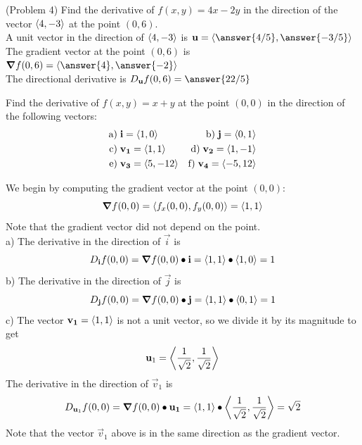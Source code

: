 \documentclass[handout]{ximera}
\begin{document}
\begin{problem}(Problem 4)
Find the derivative of $f(x,y) = 4x - 2y$ in the direction of the 
vector $\left\langle 4, -3\right\rangle$ at the point $(0, 6)$.\\
A unit vector in the direction of $\left\langle 4, -3\right\rangle$ is 
$\vec u = \vector{\answer{4/5}, \answer{-3/5}}$\\
The gradient vector at the point $(0,6)$ is 
$\grad f(0,6) = \vector{\answer{4}, \answer{-2}}$\\
The directional derivative is $D_{\vec u} f(0,6) = \answer{22/5}$
\end{problem}


\begin{example}[Example 5]
Find the derivative of $f(x,y) = x+y$ at the point $(0,0)$ in the direction 
of the following vectors:
\begin{align*}
\text{a)} \; &\mathbf{i} = \left\langle 1,0\right\rangle  &\text{b)}\;  \mathbf{j} = \left\langle 0,1\right\rangle\\
\text{c)} \; &\mathbf{v_1} = \left\langle 1,1\right\rangle  &\text{d)} \; \mathbf{v_2} = \left\langle 1, -1\right\rangle\\
\text{e)} \; &\mathbf{v_3} = \left\langle 5, -12\right\rangle & \text{f)} \; \mathbf{v_4} = \left\langle -5, 12\right\rangle
\end{align*}

We begin by computing the gradient vector at the point $(0,0)$:
\[
\boldsymbol\nabla f(0,0) = \left\langle f_x(0,0), f_y(0,0)\right\rangle = \left\langle 1,1\right\rangle
\]
Note that the gradient vector did not depend on the point.\\
a) \quad The derivative in the direction of $\vec i$ is
\[
D_{\mathbf i} f(0,0) = \boldsymbol\nabla f(0,0) \bullet \mathbf{i} = \left\langle 1,1\right\rangle \bullet \left\langle 1,0\right\rangle = 1
\]
b) \quad The derivative in the direction of $\vec j$ is
\[
D_{\mathbf j} f(0,0) = \boldsymbol\nabla f(0,0) \bullet \mathbf{j} = \left\langle 1,1\right\rangle \bullet \left\langle 0,1\right\rangle = 1
\]
c) \quad The vector $\mathbf{v_1} = \left\langle 1,1\right\rangle$ is not a unit vector, so we divide it by its 
magnitude to get
\[
\mathbf u_1 = \left\langle \frac{1}{\sqrt 2}, \frac{1}{\sqrt 2}\right\rangle
\]
The derivative in the direction of $\vec v_1$ is
\[
D_{\mathbf u_1} f(0,0) = \boldsymbol\nabla f(0,0) \bullet \mathbf{u_1} = \left\langle 1,1\right\rangle \bullet 
\left\langle \frac{1}{\sqrt 2}, \frac{1}{\sqrt 2}\right\rangle = \sqrt 2
\]
Note that the vector $\vec v_1$ above is in the same direction as the gradient vector.


\end{example}
\end{document}
